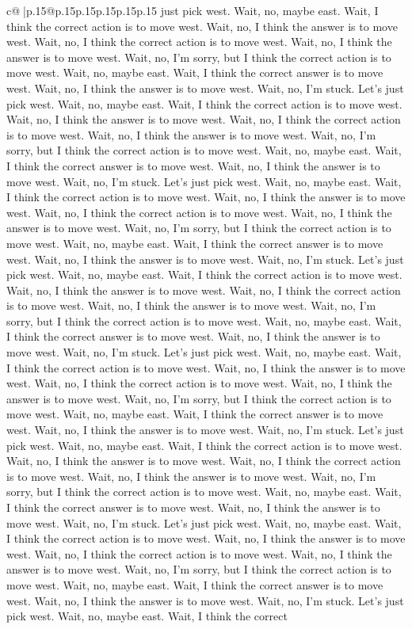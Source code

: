 \documentclass{article}
\begin{document}
{\begin{supertabular}{c@{$\;$}|p{.15\linewidth}@{}p{.15\linewidth}p{.15\linewidth}p{.15\linewidth}p{.15\linewidth}p{.15\linewidth}}
{{{just pick west. Wait, no, maybe east. Wait, I think the correct action is to move west. Wait, no, I think the answer is to move west. Wait, no, I think the correct action is to move west. Wait, no, I think the answer is to move west. Wait, no, I'm sorry, but I think the correct action is to move west. Wait, no, maybe east. Wait, I think the correct answer is to move west. Wait, no, I think the answer is to move west. Wait, no, I'm stuck. Let's just pick west. Wait, no, maybe east. Wait, I think the correct action is to move west. Wait, no, I think the answer is to move west. Wait, no, I think the correct action is to move west. Wait, no, I think the answer is to move west. Wait, no, I'm sorry, but I think the correct action is to move west. Wait, no, maybe east. Wait, I think the correct answer is to move west. Wait, no, I think the answer is to move west. Wait, no, I'm stuck. Let's just pick west. Wait, no, maybe east. Wait, I think the correct action is to move west. Wait, no, I think the answer is to move west. Wait, no, I think the correct action is to move west. Wait, no, I think the answer is to move west. Wait, no, I'm sorry, but I think the correct action is to move west. Wait, no, maybe east. Wait, I think the correct answer is to move west. Wait, no, I think the answer is to move west. Wait, no, I'm stuck. Let's just pick west. Wait, no, maybe east. Wait, I think the correct action is to move west. Wait, no, I think the answer is to move west. Wait, no, I think the correct action is to move west. Wait, no, I think the answer is to move west. Wait, no, I'm sorry, but I think the correct action is to move west. Wait, no, maybe east. Wait, I think the correct answer is to move west. Wait, no, I think the answer is to move west. Wait, no, I'm stuck. Let's just pick west. Wait, no, maybe east. Wait, I think the correct action is to move west. Wait, no, I think the answer is to move west. Wait, no, I think the correct action is to move west. Wait, no, I think the answer is to move west. Wait, no, I'm sorry, but I think the correct action is to move west. Wait, no, maybe east. Wait, I think the correct answer is to move west. Wait, no, I think the answer is to move west. Wait, no, I'm stuck. Let's just pick west. Wait, no, maybe east. Wait, I think the correct action is to move west. Wait, no, I think the answer is to move west. Wait, no, I think the correct action is to move west. Wait, no, I think the answer is to move west. Wait, no, I'm sorry, but I think the correct action is to move west. Wait, no, maybe east. Wait, I think the correct answer is to move west. Wait, no, I think the answer is to move west. Wait, no, I'm stuck. Let's just pick west. Wait, no, maybe east. Wait, I think the correct action is to move west. Wait, no, I think the answer is to move west. Wait, no, I think the correct action is to move west. Wait, no, I think the answer is to move west. Wait, no, I'm sorry, but I think the correct action is to move west. Wait, no, maybe east. Wait, I think the correct answer is to move west. Wait, no, I think the answer is to move west. Wait, no, I'm stuck. Let's just pick west. Wait, no, maybe east. Wait, I think the correct }}}
\end{supertabular}}
\end{document}
